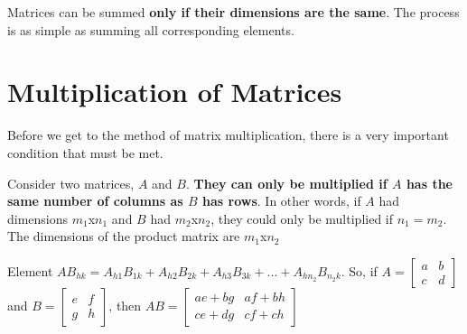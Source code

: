 \documentclass{report}
\begin{document}
Matrices can be summed \textbf{only if their dimensions are the same}. The process is as simple as summing all corresponding elements.


\section{Multiplication of Matrices}

Before we get to the method of matrix multiplication, there is a very important condition that must be met.

Consider two matrices, $A$ and $B$. \textbf{They can only be multiplied if $A$ has the same number of columns as $B$ has rows}. In other words, if $A$ had dimensions $m_1$x$n_1$ and $B$ had $m_2$x$n_2$, they could only be multiplied if $n_1=m_2$. The dimensions of the product matrix are $m_1$x$n_2$

Element $AB_{hk}=A_{h1}B_{1k}+A_{h2}B_{2k}+A_{h3}B_{3k}+...+A_{hn_2}B_{n_2k}$. So, if 
$
    A=
    \begin{bmatrix}
        a & b \\
        c & d
    \end{bmatrix}
$ 
and 
$
    B=
    \begin{bmatrix}
        e & f \\
        g & h
    \end{bmatrix}
$, 
then 
$
    AB=
    \begin{bmatrix}
        ae+bg & af+bh \\
        ce+dg & cf+ch
    \end{bmatrix}
$
\end{document}
